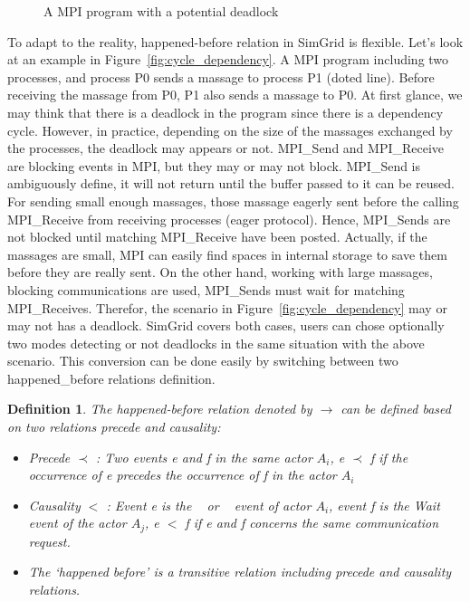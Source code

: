 \documentclass[a4paper,11pt]{article}
\newtheorem{definition}{Definition}
\begin{document}
\begin{itemize}[noitemsep]
\begin{figure}[H]
\begin{center}
	\end{center}
	\caption{A MPI program with a potential deadlock}
\end{figure}
 To adapt to the reality, happened-before relation in SimGrid is flexible. Let's look at an example in Figure~\ref{fig:cycle_dependency}. A MPI program including two processes, and process P0 sends a massage to process P1 (doted line). Before receiving  the massage from P0, P1 also sends a massage to P0. At first glance, we may think that there is a deadlock in the program since there is a dependency cycle. However, in practice, depending on the size of the massages exchanged by the processes, the deadlock may appears or not. MPI\_Send and MPI\_Receive are blocking events in MPI, but they may or may not block. MPI\_Send is ambiguously define, it will not return until the buffer passed to it can be reused. For sending small enough massages, those massage eagerly sent before the calling MPI\_Receive from receiving processes (eager protocol). Hence, MPI\_Sends are not blocked until matching MPI\_Receive have been posted. Actually, if the massages are small, MPI can easily find spaces in internal storage to save them before they are really sent. On the other hand, working with large massages, blocking communications are used, MPI\_Sends must wait for matching MPI\_Receives. Therefor, the scenario in Figure~\ref{fig:cycle_dependency} may or may not has a deadlock. SimGrid covers both cases, users can chose optionally two modes detecting or not deadlocks in the same situation with the above scenario. This conversion can be done easily by switching between two happened\_before relations definition.    
  \begin{definition}
  	\label{def:happedBefore1}
  The happened-before relation  denoted by  $\rightarrow $ can be defined based on two relations precede and causality: \begin{itemize}
  	\item Precede $ \prec$ :  Two events e and f in the same actor $A_i$, e $ \prec$ f if the occurrence of e precedes the occurrence of f in the actor $A_i$  
  	\item Causality $<$ : Event e is the \asynsend~ or \asynreceive~ event of actor $A_i$, event f is the Wait event of the actor $A_j$,  e $<$ f if e and f concerns the same communication request.
  	\item The ‘happened before’ is a transitive relation including precede and causality relations. 
  \end{itemize}\end{definition} 
  

\end{itemize}
\end{document}

